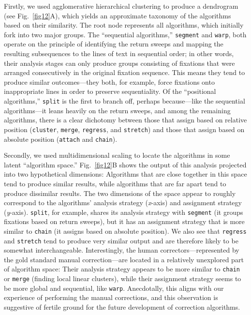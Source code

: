 \documentclass[doc,biblatex]{apa7}
\begin{document}
Firstly, we used agglomerative hierarchical clustering to produce a dendrogram (see Fig.~\ref{fig12}A), which yields an approximate taxonomy of the algorithms based on their similarity. The root node represents all algorithms, which initially fork into two major groups. The ``sequential algorithms,'' \texttt{segment} and \texttt{warp}, both operate on the principle of identifying the return sweeps and mapping the resulting subsequences to the lines of text in sequential order; in other words, their analysis stages can only produce groups consisting of fixations that were arranged consecutively in the original fixation sequence. This means they tend to produce similar outcomes---they both, for example, force fixations onto inappropriate lines in order to preserve sequentiality. Of the ``positional algorithms,'' \texttt{split} is the first to branch off, perhaps because---like the sequential algorithms---it leans heavily on the return sweeps, and among the remaining algorithms, there is a clear dichotomy between those that assign based on relative position (\texttt{cluster}, \texttt{merge}, \texttt{regress}, and \texttt{stretch}) and those that assign based on absolute position (\texttt{attach} and \texttt{chain}).

Secondly, we used multidimensional scaling to locate the algorithms in some latent ``algorithm space.'' Fig.~\ref{fig12}B shows the output of this analysis projected into two hypothetical dimensions: Algorithms that are close together in this space tend to produce similar results, while algorithms that are far apart tend to produce dissimilar results. The two dimensions of the space appear to roughly correspond to the algorithms' analysis strategy (\textit{x}-axis) and assignment strategy (\textit{y}-axis). \texttt{split}, for example, shares its analysis strategy with \texttt{segment} (it groups fixations based on return sweeps), but it has an assignment strategy that is more similar to \texttt{chain} (it assigns based on absolute position). We also see that \texttt{regress} and \texttt{stretch} tend to produce very similar output and are therefore likely to be somewhat interchangeable. Interestingly, the human correctors---represented by the gold standard manual correction---are located in a relatively unexplored part of algorithm space: Their analysis strategy appears to be more similar to \texttt{chain} or \texttt{merge} (finding local linear clusters), while their assignment strategy seems to be more global and sequential, like \texttt{warp}. Anecdotally, this aligns with our experience of performing the manual corrections, and this observation is suggestive of fertile ground for the future development of correction algorithms.
\end{document}
